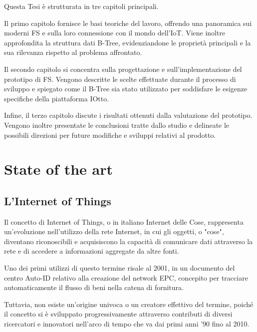 \documentclass[12pt,a4paper,openright,twoside]{book}
\begin{document}
        Questa Tesi è strutturata in tre capitoli principali.

        Il primo capitolo fornisce le basi teoriche del lavoro, offrendo una panoramica sui moderni \ac{FS} e sulla loro connessione con il mondo dell’\ac{IoT}.
        Viene inoltre approfondita la struttura dati B-Tree, evidenziandone le proprietà principali e la sua rilevanza rispetto al problema affrontato.

        Il secondo capitolo si concentra sulla progettazione e sull’implementazione del prototipo di \ac{FS}.
        Vengono descritte le scelte effettuate durante il processo di sviluppo e spiegato come il B-Tree sia stato utilizzato per soddisfare le esigenze specifiche della piattaforma IOtto.

        Infine, il terzo capitolo discute i risultati ottenuti dalla valutazione del prototipo. Vengono inoltre presentate le conclusioni tratte dallo studio e delineate le possibili direzioni per future modifiche e sviluppi relativi al prodotto.

\chapter{State of the art}

    \section{L'Internet of Things}

        Il concetto di Internet of Things, o in italiano Internet delle Cose, rappresenta un'evoluzione nell'utilizzo della rete Internet, in cui gli oggetti, o "cose", diventano riconoscibili e acquisiscono la capacità di comunicare dati attraverso la rete e di accedere a informazioni aggregate da altre fonti.

        Uno dei primi utilizzi di questo termine risale al 2001, in un documento del centro Auto-ID relativo alla creazione del network EPC, concepito per tracciare automaticamente il flusso di beni nella catena di fornitura.

        Tuttavia, non esiste un'origine univoca o un creatore effettivo del termine, poiché il concetto si è sviluppato progressivamente attraverso contributi di diversi ricercatori e innovatori nell'arco di tempo che va dai primi anni '90 fino al 2010.

        \paragraph*{}
\end{document}
